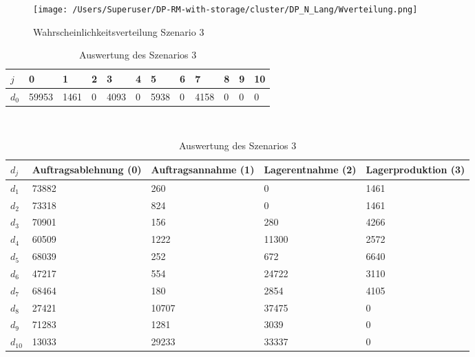 \begin{figure}[h!]
  \begin{center}
    \texttt{[image: /Users/Superuser/DP-RM-with-storage/cluster/DP\_N\_Lang/Wverteilung.png]}
    \caption{Wahrscheinlichkeitsverteilung Szenario 3}  \label{SB3}
  \end{center}
\end{figure}

\begin{table}[h!]
\renewcommand{\arraystretch}{1.5}
  \begin{center}
    \caption{Auswertung des Szenarios 3}  \label{AS3}
    \vspace*{3mm}
    \begin{tabular}{l l l l l l l l l l l l }  \hline 
         $j$ & 0 & 1  & 2 & 3 & 4  & 5 & 6 & 7 & 8 & 9 & 10  \\  \hline
$d_{0}$ &  59953 &  1461 &  0 &  4093 &  0 &  5938 &  0 &  4158 &  0 &  0 &  0 \\\hline
    \end{tabular} \\[3mm]
        \begin{tabular}{ l p{2.5cm} p{2.5cm} p{2.5cm} p{2.5cm} }   \hline    %
    $d_j$ & Auftrags\-ablehnung (0) & Auftrags\-annahme (1)  & Lager\-entnahme (2) & Lager\-produktion (3)\\\hline 
$d_{1}$  &  73882 &    260 &    0 &  1461 \\
$d_{2}$  &  73318 &    824 &    0 &  1461 \\
$d_{3}$  &  70901 &    156 &    280 &  4266 \\
$d_{4}$  &  60509 &   1222 &  11300 &  2572 \\
$d_{5}$  &  68039 &    252 &    672 &  6640 \\
$d_{6}$  &  47217 &    554 &  24722 &  3110 \\
$d_{7}$  &  68464 &    180 &   2854 &  4105 \\
$d_{8}$  &  27421 &  10707 &  37475 &   0 \\
$d_{9}$  &  71283 &   1281 &   3039 &   0 \\
$d_{10}$ &  13033 &  29233 &  33337 &   0 \\
          \hline
   \end{tabular} \\[3mm]
     \end{center}
\end{table}

